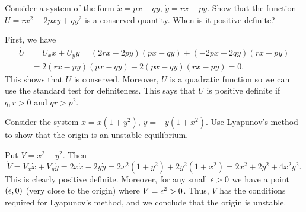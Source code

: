 \documentclass[a4paper]{amsart}
\begin{document}
\begin{exercise}\label{ex-conserved-quadratic}
 Consider a system of the form $\dot{x}=px-qy$,\; $\dot{y}=rx-py$.
 Show that the function $U=rx^2-2pxy+qy^2$ is a conserved quantity.
 When is it positive definite?
\end{exercise}
\begin{solution}
 First, we have
 \begin{align*}
  \dot{U} &= U_x\dot{x} + U_y\dot{y} 
           = (2rx-2py)(px-qy) + (-2px+2qy)(rx-py) \\
   &= 2(rx-py)(px-qy) - 2(px-qy)(rx-py) = 0.
 \end{align*}
 This shows that $U$ is conserved.  Moreover, $U$ is a quadratic
 function so we can use the standard test for definiteness.  This says
 that $U$ is positive definite if $q,r>0$ and $qr>p^2$. 
\end{solution}

\begin{exercise}\label{ex-instability}
 Consider the system $\dot{x}=x(1+y^2)$, $\dot{y}=-y(1+x^2)$.  Use
 Lyapunov's method to show that the origin is an unstable equilibrium.
\end{exercise}
\begin{solution}
 Put $V=x^2-y^2$.  Then 
 \[ \dot{V} = V_x\dot{x}+V_y\dot{y} = 2x\dot{x}-2y\dot{y} = 
     2x^2(1+y^2)+2y^2(1+x^2) = 2x^2+2y^2+4x^2y^2.
 \]
 This is clearly positive definite.  Moreover, for any small $\epsilon>0$
 we have a point $(\epsilon,0)$ (very close to the origin) where $V=\epsilon^2>0$.
 Thus, $V$ has the conditions required for Lyapunov's method, and we
 conclude that the origin is unstable.
\end{solution}
\end{document}
